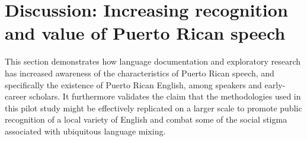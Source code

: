 \documentclass[output=paper,colorlinks,citecolor=brown]{langscibook}
\begin{document}
\section{Discussion: Increasing recognition and value of Puerto Rican speech}

This section demonstrates how language documentation and exploratory research has increased awareness of the characteristics of Puerto Rican speech, and specifically the existence of Puerto Rican English, among speakers and early-career scholars. It furthermore validates the claim that the methodologies used in this pilot study might be effectively replicated on a larger scale to promote public recognition of a local variety of English and combat some of the social stigma associated with ubiquitous language mixing. 

\begin{sloppypar}

\end{sloppypar}
\end{document}
